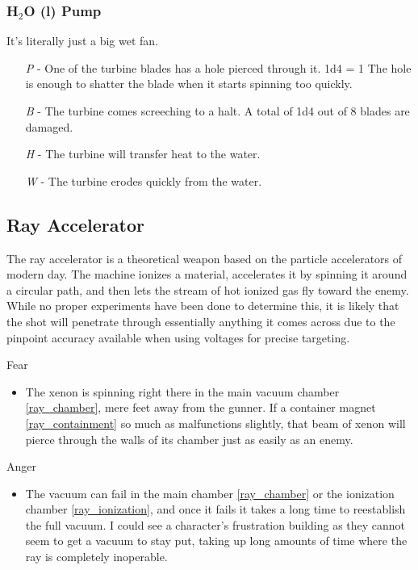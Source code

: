 \documentclass[a4paper]{article}
\begin{document}
\vspace{-0.5cm} \hspace{-18pt} \subsubsection{H$_2$O (l) Pump} \label{railgun_h2o_l_pump} \vspace{-0.2cm}
It's literally just a big wet fan.
\begin{enumerate}
\item [\textit{P}] - One of the turbine blades has a hole pierced through it. \newline \hspace*{3pt} 1d4 = 1 The hole is enough to shatter the blade when it starts spinning too quickly. 
\item [\textit{B}] - The turbine comes screeching to a halt. A total of 1d4 out of 8 blades are damaged.
\item [\textit{H}] - The turbine will transfer heat to the water. 
\item [\textit{W}] - The turbine erodes quickly from the water.
\end{enumerate}

\subsection{Ray Accelerator} \label{ray}

The ray accelerator is a theoretical weapon based on the particle accelerators of modern day. The machine ionizes a material, accelerates it by spinning it around a circular path, and then lets the stream of hot ionized gas fly toward the enemy. While no proper experiments have been done to determine this, it is likely that the shot will penetrate through essentially anything it comes across due to the pinpoint accuracy available when using voltages for precise targeting.

\vspace{0.3cm}
\begin{minipage}[t]{0.4\linewidth}
Fear
\begin{itemize}
\item The xenon is spinning right there in the main vacuum chamber \ref{ray_chamber}, mere feet away from the gunner. If a container magnet \ref{ray_containment} so much as malfunctions slightly, that beam of xenon will pierce through the walls of its chamber just as easily as an enemy. 
\end{itemize}
\end{minipage} 
\begin{minipage}[t]{0.4\linewidth}
Anger
\begin{itemize}
\item The vacuum can fail in the main chamber \ref{ray_chamber} or the ionization chamber \ref{ray_ionization}, and once it fails it takes a long time to reestablish the full vacuum. I could see a character's frustration building as they cannot seem to get a vacuum to stay put, taking up long amounts of time where the ray is completely inoperable.
\end{itemize}
\end{minipage}
\end{document}
